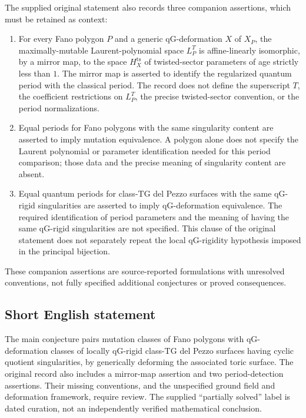 \documentclass[11pt]{article}
\begin{document}
The supplied original statement also records three companion assertions, which must be retained as context:
\begin{enumerate}
\item For every Fano polygon \(P\) and a generic qG-deformation \(X\) of \(X_P\), the maximally-mutable Laurent-polynomial space \(L_P^T\) is affine-linearly isomorphic, by a mirror map, to the space \(H_X^{\mathrm{ts}}\) of twisted-sector parameters of age strictly less than \(1\). The mirror map is asserted to identify the regularized quantum period with the classical period. The record does not define the superscript \(T\), the coefficient restrictions on \(L_P^T\), the precise twisted-sector convention, or the period normalizations.
\item Equal periods for Fano polygons with the same singularity content are asserted to imply mutation equivalence. A polygon alone does not specify the Laurent polynomial or parameter identification needed for this period comparison; those data and the precise meaning of singularity content are absent.
\item Equal quantum periods for class-\(\mathrm{TG}\) del Pezzo surfaces with the same qG-rigid singularities are asserted to imply qG-deformation equivalence. The required identification of period parameters and the meaning of having the same qG-rigid singularities are not specified. This clause of the original statement does not separately repeat the local qG-rigidity hypothesis imposed in the principal bijection.
\end{enumerate}
These companion assertions are source-reported formulations with unresolved conventions, not fully specified additional conjectures or proved consequences.
\subsection{Short English statement}
The main conjecture pairs mutation classes of Fano polygons with qG-deformation classes of locally qG-rigid class-\(\mathrm{TG}\) del Pezzo surfaces having cyclic quotient singularities, by generically deforming the associated toric surface. The original record also includes a mirror-map assertion and two period-detection assertions. Their missing conventions, and the unspecified ground field and deformation framework, require review. The supplied ``partially solved'' label is dated curation, not an independently verified mathematical conclusion.
\end{document}
